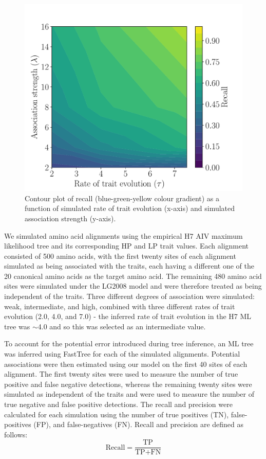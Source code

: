 \documentclass[]{article}
\begin{document}
\begin{figure}[h!]
	\centering
	\includegraphics[width=0.7\columnwidth]{benchmarks_contour.pdf}
	\caption{Contour plot of recall (blue-green-yellow colour gradient) as a function of simulated rate of trait evolution (x-axis) and simulated association strength (y-axis).}
	\label{fig:benchmarks}%
\end{figure}
We simulated amino acid alignments using the empirical H7 AIV maximum likelihood tree and its corresponding HP and LP trait values. Each alignment consisted of 500 amino acids, with the first twenty sites of each alignment simulated as being associated with the traits, each having a different one of the 20 canonical amino acids as the target amino acid. The remaining 480 amino acid sites were simulated under the LG2008 model and were therefore treated as being independent of the traits. Three different degrees of association were simulated: weak, intermediate, and high, combined with three different rates of trait evolution (2.0, 4.0, and 7.0) - the inferred rate of trait evolution in the H7 ML tree was $\sim$4.0 and so this was selected as an intermediate value. 

To account for the potential error introduced during tree inference, an ML tree was inferred using FastTree \citep{price2010fasttree}  for each of the simulated alignments. Potential associations were then estimated using our model on the first 40 sites of each alignment. The first twenty sites were used to measure the number of true positive and false negative detections, whereas the remaining twenty sites were simulated as independent of the traits and were used to measure the number of true negative and false positive detections. The recall and precision were calculated for each simulation using the number of true positives (TN), false-positives (FP), and false-negatives (FN).  Recall and precision are defined as follows:
\begin{equation}
\text{Recall}=\frac{\text{TP}}{\text{TP}+\text{FN}}
\end{equation}
\end{document}
